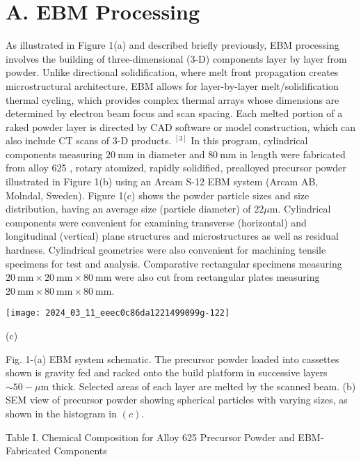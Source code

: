 \documentclass[10pt]{article}
\begin{document}
\section*{A. EBM Processing}
As illustrated in Figure 1(a) and described briefly previously, EBM processing involves the building of three-dimensional (3-D) components layer by layer from powder. Unlike directional solidification, where melt front propagation creates microstructural architecture, EBM allows for layer-by-layer melt/solidification thermal cycling, which provides complex thermal arrays whose dimensions are determined by electron beam focus and scan spacing. Each melted portion of a raked powder layer is directed by CAD software or model construction, which can also include CT scans of 3-D products. ${ }^{[3]}$ In this program, cylindrical components measuring $20 \mathrm{~mm}$ in diameter and $80 \mathrm{~mm}$ in length were fabricated from alloy 625 , rotary atomized, rapidly solidified, prealloyed precursor powder illustrated in Figure 1(b) using an Arcam S-12 EBM system (Arcam AB, Molndal, Sweden). Figure 1(c) shows the powder particle sizes and size distribution, having an average size (particle diameter) of $22 \mu \mathrm{m}$. Cylindrical components were convenient for examining transverse (horizontal) and longitudinal (vertical) plane structures and microstructures as well as residual hardness. Cylindrical geometries were also convenient for machining tensile specimens for test and analysis. Comparative rectangular specimens measuring $20 \mathrm{~mm} \times 20 \mathrm{~mm} \times 80 \mathrm{~mm}$ were also cut from rectangular plates measuring $20 \mathrm{~mm} \times 80 \mathrm{~mm} \times 80 \mathrm{~mm}$.

\begin{center}
\texttt{[image: 2024\_03\_11\_eeec0c86da1221499099g-122]}
\end{center}

(c)

Fig. 1-(a) EBM system schematic. The precursor powder loaded into cassettes shown is gravity fed and racked onto the build platform in successive layers $\sim 50-\mu \mathrm{m}$ thick. Selected areas of each layer are melted by the scanned beam. (b) SEM view of precursor powder showing spherical particles with varying sizes, as shown in the histogram in $(c)$.

Table I. Chemical Composition for Alloy 625 Precursor Powder and EBM-Fabricated Components
\end{document}
